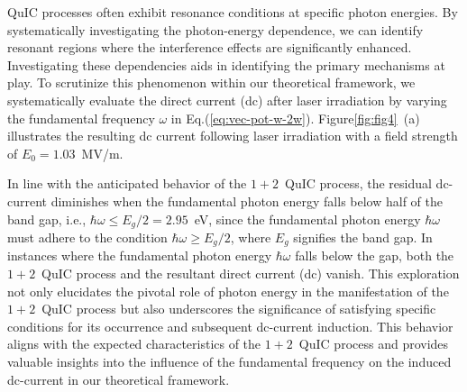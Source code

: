 \gls{QuIC} processes often exhibit resonance conditions at specific photon energies. By systematically investigating the photon-energy dependence, we can identify resonant regions where the interference effects are significantly enhanced.  Investigating these dependencies aids in identifying the primary mechanisms at play. To scrutinize this phenomenon within our theoretical framework, we systematically evaluate the direct current (dc) after laser irradiation by varying the fundamental frequency $\omega$ in Eq.(\ref{eq:vec-pot-w-2w}). Figure\ref{fig:fig4}~(a) illustrates the resulting dc current following laser irradiation with a field strength of $E_0=1.03$~MV/m. 

In line with the anticipated behavior of the $1+2$~\gls{QuIC} process, the residual dc-current diminishes when the fundamental photon energy falls below half of the band gap, i.e., $\hbar \omega \le E_g/2 = 2.95$~eV,  since the fundamental photon energy $\hbar \omega$ must adhere to the condition $\hbar \omega \ge E_g/2$, where $E_g$ signifies the band gap. 
In instances where the fundamental photon energy $\hbar \omega$ falls below the gap, both the $1+2$~QuIC process and the resultant direct current (dc) vanish. This exploration not only elucidates the pivotal role of photon energy in the manifestation of the $1+2$~\gls{QuIC} process but also underscores the significance of satisfying specific conditions for its occurrence and subsequent dc-current induction.
This behavior aligns with the expected characteristics of the $1+2$~\gls{QuIC} process and provides valuable insights into the influence of the fundamental frequency on the induced dc-current in our theoretical framework.
